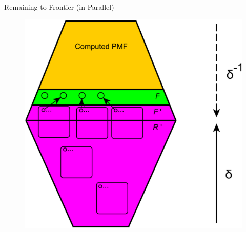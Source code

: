 \documentclass{beamer}
\begin{document}
\begin{frame}{Remaining to Frontier (in Parallel)}
	\begin{figure}
		\includegraphics[height=0.8\textheight]{figs/r2f_parallel.pdf}
		\caption{}
	\end{figure}
\end{frame}
%
%	
%	
%
\end{document}
